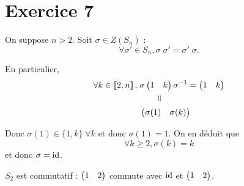 \part{Exercice 7}

On suppose $n > 2$.
Soit $\sigma \in Z(S_n)$ : \[
	\forall \sigma'\in S_n, \sigma\;\sigma' = \sigma'\;\sigma.
\]

En particulier,
\begin{align*}
	\forall k \in \left\llbracket 2,n \right\rrbracket,\; &\sigma\mat{1&k}\sigma^{-1} = \mat{1&k}\\
	&\phantom{\sigma\mat{1}}\vrt=\\
	&\mat{\sigma(1)&\sigma(k)}
\end{align*}

Donc $\sigma(1) \in \{1,k\}\;\forall k$ et donc $\sigma(1) = 1$. On en déduit que \[
	\forall k \ge 2, \sigma(k) = k
\] et donc $\sigma = \operatorname{id}$.

$S_2$ est commutatif : $\begin{pmatrix} 1&2 \end{pmatrix}$ commute avec $\operatorname{id}$ et $\begin{pmatrix} 1&2 \end{pmatrix}$.

